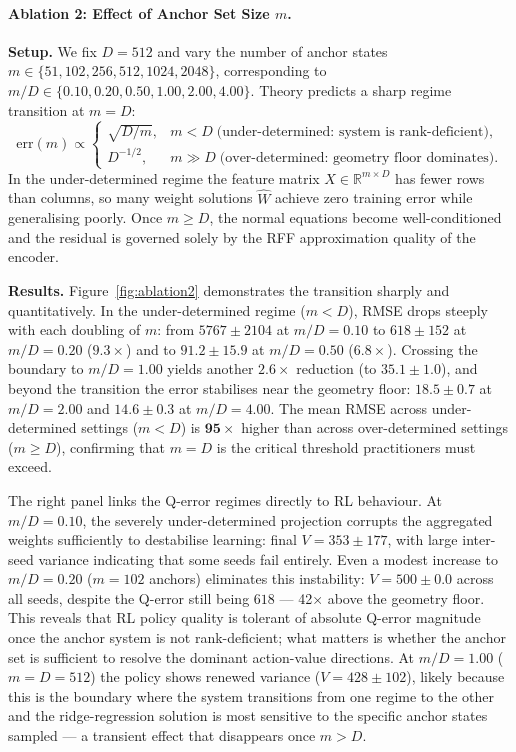 \paragraph{Ablation 2: Effect of Anchor Set Size $m$.}

\textbf{Setup.}
We fix $D=512$ and vary the number of anchor states $m \in \{51, 102, 256, 512, 1024, 2048\}$, corresponding to $m/D \in \{0.10, 0.20, 0.50, 1.00, 2.00, 4.00\}$.
Theory predicts a sharp regime transition at $m = D$:
\[
\mathrm{err}(m) \propto
\begin{cases}
\sqrt{D/m}, & m < D \;\text{(under-determined: system is rank-deficient)}, \\
D^{-1/2},   & m \gg D \;\text{(over-determined: geometry floor dominates)}.
\end{cases}
\]
In the under-determined regime the feature matrix $X \in \mathbb{R}^{m \times D}$ has fewer rows than columns, so many weight solutions $\hat{W}$ achieve zero training error while generalising poorly.
Once $m \geq D$, the normal equations become well-conditioned and the residual is governed solely by the RFF approximation quality of the encoder.

\textbf{Results.}
Figure~\ref{fig:ablation2} demonstrates the transition sharply and quantitatively.
In the under-determined regime ($m < D$), RMSE drops steeply with each doubling of $m$: from $5767 \pm 2104$ at $m/D=0.10$ to $618 \pm 152$ at $m/D=0.20$ ($9.3\times$) and to $91.2 \pm 15.9$ at $m/D=0.50$ ($6.8\times$).
Crossing the boundary to $m/D=1.00$ yields another $2.6\times$ reduction (to $35.1 \pm 1.0$), and beyond the transition the error stabilises near the geometry floor: $18.5 \pm 0.7$ at $m/D=2.00$ and $14.6 \pm 0.3$ at $m/D=4.00$.
The mean RMSE across under-determined settings ($m < D$) is $\mathbf{95\times}$ higher than across over-determined settings ($m \geq D$), confirming that $m = D$ is the critical threshold practitioners must exceed.

The right panel links the Q-error regimes directly to RL behaviour.
At $m/D=0.10$, the severely under-determined projection corrupts the aggregated weights sufficiently to destabilise learning: final $V = 353 \pm 177$, with large inter-seed variance indicating that some seeds fail entirely.
Even a modest increase to $m/D=0.20$ ($m=102$ anchors) eliminates this instability: $V = 500 \pm 0.0$ across all seeds, despite the Q-error still being $618$ — 42× above the geometry floor.
This reveals that RL policy quality is tolerant of absolute Q-error magnitude once the anchor system is not rank-deficient; what matters is whether the anchor set is sufficient to resolve the dominant action-value directions.
At $m/D=1.00$ ($m=D=512$) the policy shows renewed variance ($V=428 \pm 102$), likely because this is the boundary where the system transitions from one regime to the other and the ridge-regression solution is most sensitive to the specific anchor states sampled — a transient effect that disappears once $m > D$.

